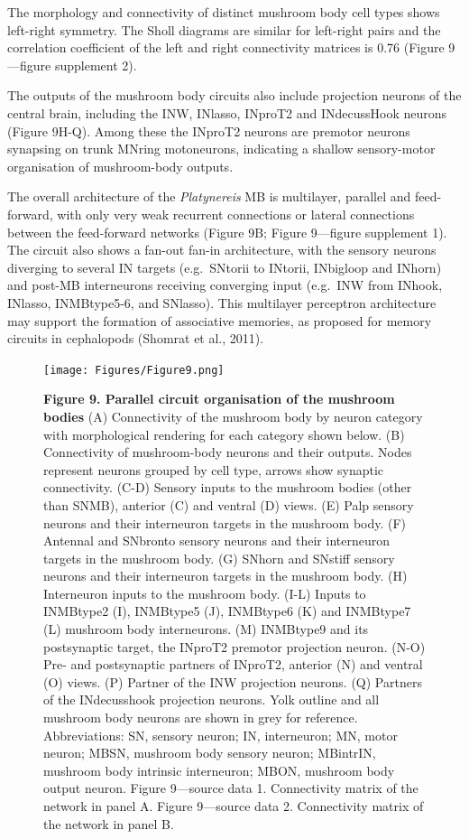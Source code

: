 \documentclass[
  11pt,
]{article}
\begin{document}
The morphology and connectivity of distinct mushroom body cell types
shows left-right symmetry. The Sholl diagrams are similar for left-right
pairs and the correlation coefficient of the left and right connectivity
matrices is 0.76 (Figure 9---figure supplement 2).

The outputs of the mushroom body circuits also include projection
neurons of the central brain, including the INW, INlasso, INproT2 and
INdecussHook neurons (Figure 9H-Q). Among these the INproT2 neurons are
premotor neurons synapsing on trunk MNring motoneurons, indicating a
shallow sensory-motor organisation of mushroom-body outputs.

The overall architecture of the \emph{Platynereis} MB is multilayer,
parallel and feed-forward, with only very weak recurrent connections or
lateral connections between the feed-forward networks (Figure 9B; Figure
9---figure supplement 1). The circuit also shows a fan-out fan-in
architecture, with the sensory neurons diverging to several IN targets
(e.g.~SNtorii to INtorii, INbigloop and INhorn) and post-MB interneurons
receiving converging input (e.g.~INW from INhook, INlasso, INMBtype5-6,
and SNlasso). This multilayer perceptron architecture may support the
formation of associative memories, as proposed for memory circuits in
cephalopods (Shomrat et al., 2011).

\begin{figure}[H]

{\centering \texttt{[image: Figures/Figure9.png]}

}

\caption{\textbf{Figure 9. Parallel circuit organisation of the mushroom
bodies} (A) Connectivity of the mushroom body by neuron category with
morphological rendering for each category shown below. (B) Connectivity
of mushroom-body neurons and their outputs. Nodes represent neurons
grouped by cell type, arrows show synaptic connectivity. (C-D) Sensory
inputs to the mushroom bodies (other than SNMB), anterior (C) and
ventral (D) views. (E) Palp sensory neurons and their interneuron
targets in the mushroom body. (F) Antennal and SNbronto sensory neurons
and their interneuron targets in the mushroom body. (G) SNhorn and
SNstiff sensory neurons and their interneuron targets in the mushroom
body. (H) Interneuron inputs to the mushroom body. (I-L) Inputs to
INMBtype2 (I), INMBtype5 (J), INMBtype6 (K) and INMBtype7 (L) mushroom
body interneurons. (M) INMBtype9 and its postsynaptic target, the
INproT2 premotor projection neuron. (N-O) Pre- and postsynaptic partners
of INproT2, anterior (N) and ventral (O) views. (P) Partner of the INW
projection neurons. (Q) Partners of the INdecusshook projection neurons.
Yolk outline and all mushroom body neurons are shown in grey for
reference. Abbreviations: SN, sensory neuron; IN, interneuron; MN, motor
neuron; MBSN, mushroom body sensory neuron; MBintrIN, mushroom body
intrinsic interneuron; MBON, mushroom body output neuron. Figure
9---source data 1. Connectivity matrix of the network in panel A. Figure
9---source data 2. Connectivity matrix of the network in panel B.}

\end{figure}%
\end{document}
